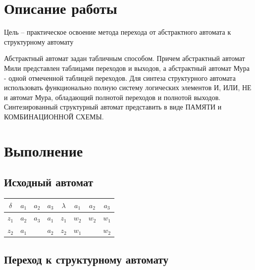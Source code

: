 
\def \labnum {3}
\def \labsubj {Теория автоматов}
\def \labauthor {Чебыкин И. Б.}
\def \labgroup {P3301}
\def \labinsp {Ожиганов А. А.}
\def \labname {Канонический метод структурного синтеза \\ Вариант: 1}
\isnametrue

\usepackage{listings,longtable,amsmath,amsfonts,graphicx,tikz,tabularx,pgf,multirow}
\usepackage{caption}
\usepackage{float}
\usetikzlibrary{arrows,automata}

\captionsetup{labelsep=period}
\pagestyle{fancy}



\section{Описание работы}
Цель -- практическое освоение метода перехода от абстрактного
автомата к структурному автомату

Абстрактный автомат задан табличным способом. Причем
абстрактный автомат Мили представлен таблицами переходов и
выходов, а абстрактный автомат Мура - одной отмеченной таблицей
переходов. Для синтеза структурного автомата использовать
функционально полную систему логических элементов И, ИЛИ, НЕ и
автомат Мура, обладающий полнотой переходов и полнотой выходов.
Синтезированный структурный автомат представить в виде ПАМЯТИ и
КОМБИНАЦИОННОЙ СХЕМЫ.

\section{Выполнение}
\subsection{Исходный автомат}

\begin{table}[!h]
\begin{tabular}{|c|c|c|c|c|c|c|c|}
\hline
$\delta$  & $a_1$ & $a_2$ & $a_3$ & $\lambda$ & $a_1$ & $a_2$ & $a_3$ \\ \hline
$z_1$     & $a_2$ & $a_3$ & $a_1$ & $z_1$     & $w_2$ & $w_2$ & $w_1$ \\ \hline
$z_2$     & $a_1$ &       & $a_2$ & $z_2$     & $w_1$ &       & $w_2$ \\ \hline
\end{tabular}
\end{table}
\subsection{Переход к структурному автомату}

